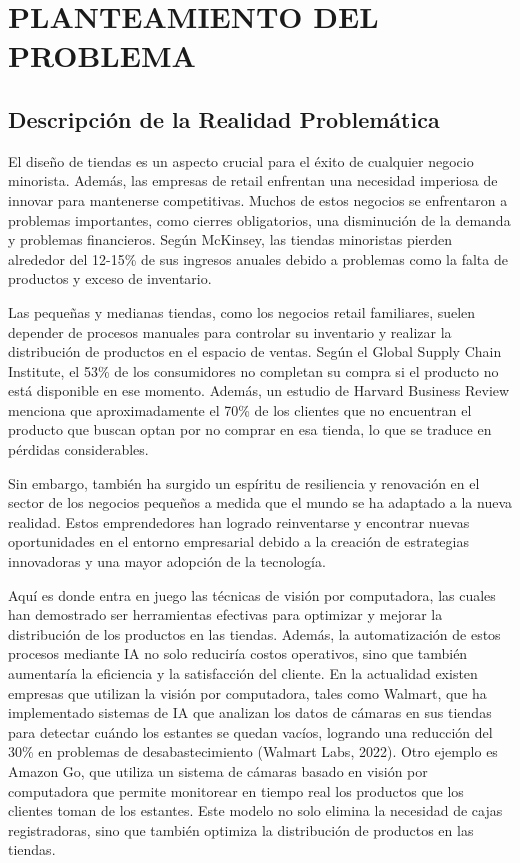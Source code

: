 \chapter{PLANTEAMIENTO DEL PROBLEMA}
\section{Descripción de la Realidad Problemática}


El diseño de tiendas es un aspecto crucial para el éxito de cualquier negocio minorista. Además, las empresas de retail enfrentan una necesidad imperiosa de innovar para mantenerse competitivas. Muchos de estos negocios se enfrentaron a problemas importantes, como cierres obligatorios, una disminución de la demanda y problemas financieros. Según McKinsey, las tiendas minoristas pierden alrededor del 12-15\% de sus ingresos anuales debido a problemas como la falta de productos y exceso de inventario.

Las pequeñas y medianas tiendas, como los negocios retail familiares, suelen depender de procesos manuales para controlar su inventario y realizar la distribución de productos en el espacio de ventas. Según el Global Supply Chain Institute, el 53\% de los consumidores no completan su compra si el producto no está disponible en ese momento. Además, un estudio de Harvard Business Review menciona que aproximadamente el 70\% de los clientes que no encuentran el producto que buscan optan por no comprar en esa tienda, lo que se traduce en pérdidas considerables.

Sin embargo, también ha surgido un espíritu de resiliencia y renovación en el sector de los negocios pequeños a medida que el mundo se ha adaptado a la nueva realidad. Estos emprendedores han logrado reinventarse y encontrar nuevas oportunidades en el entorno empresarial debido a la creación de estrategias innovadoras y una mayor adopción de la tecnología.

Aquí es donde entra en juego las técnicas de visión por computadora, las cuales han demostrado ser herramientas efectivas para optimizar y mejorar la distribución de los productos en las tiendas. Además, la automatización de estos procesos mediante IA no solo reduciría costos operativos, sino que también aumentaría la eficiencia y la satisfacción del cliente. En la actualidad existen empresas que utilizan la visión por computadora, tales como Walmart, que ha implementado sistemas de IA que analizan los datos de cámaras en sus tiendas para detectar cuándo los estantes se quedan vacíos, logrando una reducción del 30\% en problemas de desabastecimiento (Walmart Labs, 2022). Otro ejemplo es Amazon Go, que utiliza un sistema de cámaras basado en visión por computadora que permite monitorear en tiempo real los productos que los clientes toman de los estantes. Este modelo no solo elimina la necesidad de cajas registradoras, sino que también optimiza la distribución de productos en las tiendas.

